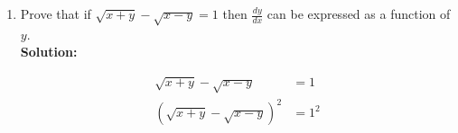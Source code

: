 \documentclass[12pt]{book}
\begin{document}
\begin{enumerate}
\begin{enumerate}
\end{enumerate}

\newpage
\setcounter{equation}{0}
\item Prove that if $\sqrt{x+y}-\sqrt{x-y}=1$ then $\frac{dy}{dx}$ can be expressed as a function of $y$.\\

\textbf{Solution:}\\

\begingroup
\addtolength{\jot}{0.5em}
\begin{align}
    \sqrt{x+y} - \sqrt{x-y} &= 1\\
    \left(\sqrt{x+y} - \sqrt{x-y}\right)^2 &= 1^2\\

\end{align}
\end{enumerate}
\end{document}
